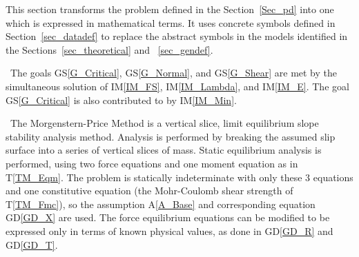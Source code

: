 \documentclass[12pt]{article}
\newcommand{\aref}[1]{A\ref{#1}}
\newcommand{\gsref}[1]{GS\ref{#1}}
\newcommand{\tref}[1]{T\ref{#1}}
\newcommand{\iref}[1]{IM\ref{#1}}
\newcommand{\dref}[1]{GD\ref{#1}}
\begin{document}
This section transforms the problem defined in the
Section~\ref{Sec_pd} into one which is expressed in mathematical
terms. It uses concrete symbols defined in Section~\ref{sec_datadef}
to replace the abstract symbols in the models identified in the
Sections~\ref{sec_theoretical} and ~\ref{sec_gendef}.

~\newline\noindent The goals \gsref{G_Critical}, \gsref{G_Normal}, and 
\gsref{G_Shear} are met by the simultaneous solution of \iref{IM_FS}, 
\iref{IM_Lambda}, and \iref{IM_E}. The goal \gsref{G_Critical} is also 
contributed to by \iref{IM_Min}.

~\newline\noindent The Morgenstern-Price Method is a vertical slice,
limit equilibrium slope stability analysis method. Analysis is
performed by breaking the assumed slip surface into a series of
vertical slices of mass. Static equilibrium analysis is performed, using two 
force equations and one moment equation as in \tref{TM_Eqm}. The problem
is statically indeterminate with only these 3 equations and one
constitutive equation (the Mohr-Coulomb shear strength of
\tref{TM_Fmc}), so the assumption \aref{A_Base} and corresponding equation 
\dref{GD_X} are used. The force equilibrium equations can be modified to be 
expressed only in terms of known physical values, as done in \dref{GD_R} and 
\dref{GD_T}.

~\newline


\end{document}
